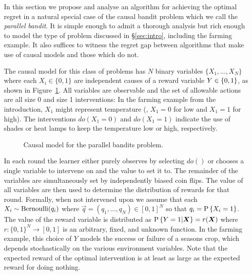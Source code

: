 

In this section we propose and analyse an algorithm for achieving the optimal regret in a natural special 
case of the causal bandit problem which we call the {\it parallel bandit}.
It is simple enough to admit a thorough analysis but rich enough to model the type of problem discussed in \S\ref{sec:intro}, including the farming example. 
It also suffices to witness the regret gap between algorithms that make use of causal models and those which do not.

The causal model for this class of problems has $N$ binary variables $\{ X_1, \ldots, X_N \}$ where each $X_i \in \{0,1\}$ are independent causes of a 
reward variable $Y \in \set{0,1}$, as shown in Figure~\ref{fig:causalStructure}.
All variables are observable and the set of allowable actions are all size 0 and size 1 interventions: 
In the farming example from the introduction, $X_1$ might represent temperature (\eg, $X_1=0$ for low and $X_1=1$ for high). 
The interventions $do(X_1 = 0)$ and $do(X_1 = 1)$ indicate the use of shades or heat lamps to keep the temperature low or high, respectively.


\begin{figure}[h]
\centering
{}
\caption{Causal model for the parallel bandits problem.\label{fig:causalStructure}}
\end{figure}

In each round the learner either purely observes by selecting $do()$ or chooses a single variable to intervene on and the value to set it to. 
The remainder of the variables are simultaneously set by independently biased coin flips. 
The value of all variables are then used to determine the distribution of rewards for that round.
Formally, when not intervened upon we assume that each $X_i \sim \bernoulli(q_i)$ where $\vec{q} = (q_1, \ldots, q_N) \in [0,1]^N$ so that $q_i = \P{X_i = 1}$.
The value of the reward variable is distributed as $\P{Y = 1|\vec{X}} = r(\vec{X})$ where 
$r : \{0,1\}^N \to [0,1]$ is an arbitrary, fixed, and unknown function. 
In the farming example, this choice of $Y$ models the success or failure of a seasons crop, which depends stochastically on the various environment variables.
Note that the expected reward of the optimal intervention is at least as large as the expected reward for doing nothing.

